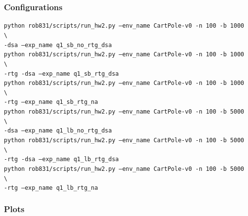 \documentclass{article}
\begin{document}
\subsubsection{Configurations}
\begin{answer}[title=Q5.1.1, height=6cm, width=\linewidth]
\texttt{python rob831/scripts/run\_hw2.py --env\_name CartPole-v0 -n 100 -b 1000 \textbackslash}
\\
\texttt{\hspace{1cm}-dsa --exp\_name q1\_sb\_no\_rtg\_dsa}
\\
\texttt{python rob831/scripts/run\_hw2.py --env\_name CartPole-v0 -n 100 -b 1000 \textbackslash}
\\
\texttt{\hspace{1cm}-rtg -dsa --exp\_name q1\_sb\_rtg\_dsa}
\\
\texttt{python rob831/scripts/run\_hw2.py --env\_name CartPole-v0 -n 100 -b 1000 \textbackslash}
\\
\texttt{\hspace{1cm}-rtg --exp\_name q1\_sb\_rtg\_na}
\\
\texttt{python rob831/scripts/run\_hw2.py --env\_name CartPole-v0 -n 100 -b 5000 \textbackslash}
\\
\texttt{\hspace{1cm}-dsa --exp\_name q1\_lb\_no\_rtg\_dsa}
\\
\texttt{python rob831/scripts/run\_hw2.py --env\_name CartPole-v0 -n 100 -b 5000 \textbackslash}
\\
\texttt{\hspace{1cm}-rtg -dsa --exp\_name q1\_lb\_rtg\_dsa}
\\
\texttt{python rob831/scripts/run\_hw2.py --env\_name CartPole-v0 -n 100 -b 5000 \textbackslash}
\\
\texttt{\hspace{1cm}-rtg --exp\_name q1\_lb\_rtg\_na}

\end{answer}


\subsubsection{Plots}
\end{document}
